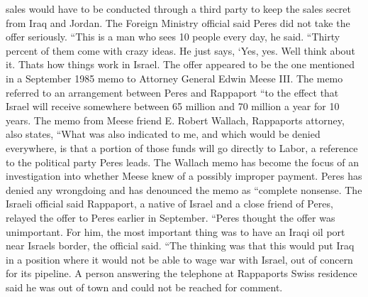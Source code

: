 \documentclass{article}
\begin{document}
\color[rgb]{0.9137254901960784,0.34509803921568627,0.1568627450980392}sales would have to be conducted through a third party to keep the sales secret from \color[rgb]{0.8666666666666667,0.11372549019607843,0.5411764705882353}Iraq and \color[rgb]{0.9137254901960784,0.34509803921568627,0.1568627450980392}Jordan. The Foreign Ministry official said Peres did not take the offer seriously. ``This is a man who sees 10 people every day, he said. ``Thirty percent of them come with \color[rgb]{0.9372549019607843,0.48627450980392156,0.396078431372549}crazy \color[rgb]{0.9137254901960784,0.34509803921568627,0.1568627450980392}ideas. He just says, `Yes, yes. Well think about it. Thats how things work in Israel. The offer appeared to be the one mentioned in a September 1985 memo to Attorney General Edwin Meese III. The memo referred to an arrangement between Peres and Rappaport ``to the effect that Israel will receive somewhere between 65 million and 70 million a year for 10 years. The memo from Meese friend E. Robert Wallach, Rappaports attorney, also states, ``What was also indicated to me, and which would be denied everywhere, is that a portion of those funds will go directly to Labor, a reference to the political party Peres leads. The Wallach memo has become the focus of an investigation into whether Meese knew of a possibly improper payment. Peres has denied any wrongdoing and has denounced the memo as ``complete nonsense. The Israeli official said Rappaport, a native of Israel and a close friend of Peres, relayed the offer to Peres earlier in September. ``Peres thought the offer was unimportant. For him, the most important thing was to have an \color[rgb]{0.8666666666666667,0.11372549019607843,0.5411764705882353}Iraqi oil \color[rgb]{0.9137254901960784,0.34509803921568627,0.1568627450980392}port near Israels border, the official said. ``The thinking was that this would put \color[rgb]{0.8666666666666667,0.11372549019607843,0.5411764705882353}Iraq in a \color[rgb]{0.9137254901960784,0.34509803921568627,0.1568627450980392}position where it would not be able to wage war with Israel, out of concern for its pipeline. A person answering the telephone at Rappaports Swiss residence said he was out of town and could not be reached for comment. 
\end{document}
